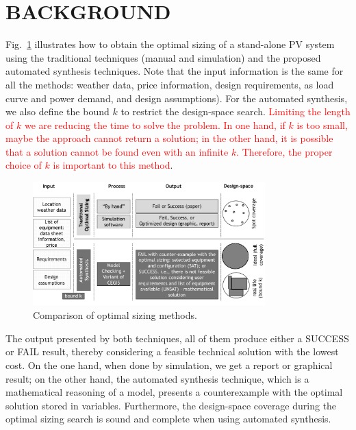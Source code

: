 \documentclass[runningheads]{llncs}
\begin{document}
\section{BACKGROUND}
\label{sec:AutomatedVerification}
Fig.~\ref{fig:optimization} illustrates how to obtain the optimal sizing of a stand-alone PV system using the traditional techniques (manual and simulation) and the proposed automated synthesis techniques. Note that the input information is the same for all the methods: weather data, price information, design requirements, as load curve and power demand, and design assumptions). For the automated synthesis, we also define the bound $k$ to restrict the design-space search. \textcolor{red}{Limiting the length of $k$ we are reducing the time to solve the problem. In one hand, if $k$ is too small, maybe the approach cannot return a solution; in the other hand, it is possible that a solution cannot be found even with an infinite $k$. Therefore, the proper choice of $k$ is important to this method}. 
%
\begin{figure}[h]
\includegraphics[width=0.8\textwidth]{optimalsizingprocess3}
\centering
\caption{Comparison of optimal sizing methods.}
\label{fig:optimization}
\end{figure}

The output presented by both techniques, all of them produce either a SUCCESS or FAIL result, thereby considering a feasible technical solution with the lowest cost. On the one hand, when done by simulation, we get a report or graphical result; on the other hand, the automated synthesis technique, which is a mathematical reasoning of a model, presents a counterexample with the optimal solution stored in variables. Furthermore, the design-space coverage during the optimal sizing search is sound and complete when using automated synthesis.
\end{document}
